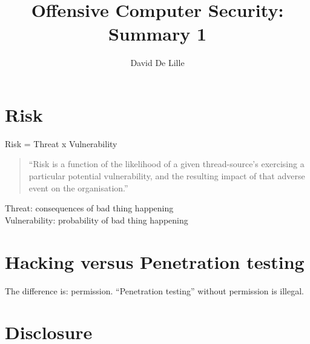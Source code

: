 \documentclass[letterpaper]{article}
\author{David De Lille}
\title{Offensive Computer Security: Summary 1}
\begin{document}
\maketitle

\section{Risk}
Risk = Threat x Vulnerability

\begin{quote}
``Risk is a function of the likelihood of a given thread-source's exercising a particular potential vulnerability, and the resulting impact of that adverse event on the organisation.''
\end{quote}

Threat: consequences of bad thing happening\\
Vulnerability: probability of bad thing happening

\section{Hacking versus Penetration testing}
The difference is: permission. ``Penetration testing'' without permission is illegal.

\section{Disclosure}
\end{document}
